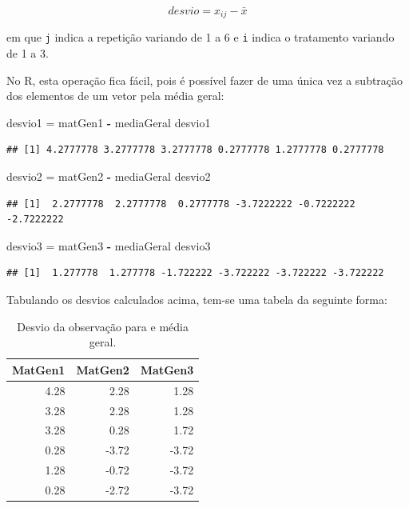 \documentclass[
]{article}
\newenvironment{Shaded}{\begin{snugshade}}{\end{snugshade}}
\newcommand{\NormalTok}[1]{#1}
\newcommand{\OperatorTok}[1]{\textcolor[rgb]{0.81,0.36,0.00}{\textbf{#1}}}
\newcommand{\StringTok}[1]{\textcolor[rgb]{0.31,0.60,0.02}{#1}}
\begin{document}
\[desvio = x_{ij} - \bar{x}\]

em que \texttt{j} indica a repetição variando de 1 a 6 e \texttt{i} indica o tratamento variando de 1 a 3.

No R, esta operação fica fácil, pois é possível fazer de uma única vez a subtração dos elementos de um vetor pela média geral:

\begin{Shaded}
\begin{Highlighting}[]
\NormalTok{desvio1 =}\StringTok{ }\NormalTok{matGen1 }\OperatorTok{-}\StringTok{ }\NormalTok{mediaGeral}
\NormalTok{desvio1}
\end{Highlighting}
\end{Shaded}

\begin{verbatim}
## [1] 4.2777778 3.2777778 3.2777778 0.2777778 1.2777778 0.2777778
\end{verbatim}

\begin{Shaded}
\begin{Highlighting}[]
\NormalTok{desvio2 =}\StringTok{ }\NormalTok{matGen2 }\OperatorTok{-}\StringTok{ }\NormalTok{mediaGeral}
\NormalTok{desvio2}
\end{Highlighting}
\end{Shaded}

\begin{verbatim}
## [1]  2.2777778  2.2777778  0.2777778 -3.7222222 -0.7222222 -2.7222222
\end{verbatim}

\begin{Shaded}
\begin{Highlighting}[]
\NormalTok{desvio3 =}\StringTok{ }\NormalTok{matGen3 }\OperatorTok{-}\StringTok{ }\NormalTok{mediaGeral}
\NormalTok{desvio3}
\end{Highlighting}
\end{Shaded}

\begin{verbatim}
## [1]  1.277778  1.277778 -1.722222 -3.722222 -3.722222 -3.722222
\end{verbatim}

Tabulando os desvios calculados acima, tem-se uma tabela da seguinte forma:

\begin{table}

\caption{\label{tab:unnamed-chunk-16}Desvio da observação para e média geral.}
\centering
\begin{tabular}[t]{r|r|r}
\hline
MatGen1 & MatGen2 & MatGen3\\
\hline
4.28 & 2.28 & 1.28\\
\hline
3.28 & 2.28 & 1.28\\
\hline
3.28 & 0.28 & 1.72\\
\hline
0.28 & -3.72 & -3.72\\
\hline
1.28 & -0.72 & -3.72\\
\hline
0.28 & -2.72 & -3.72\\
\hline
\end{tabular}
\end{table}
\end{document}
